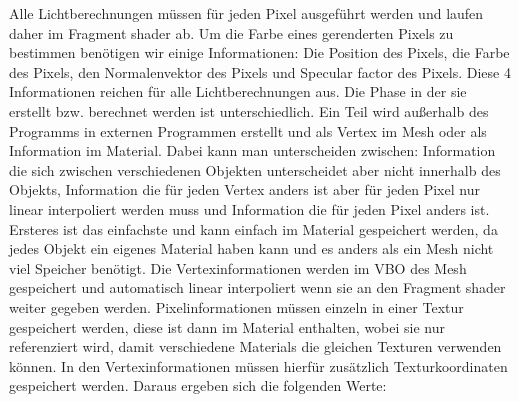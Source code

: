 Alle Lichtberechnungen müssen für jeden Pixel ausgeführt werden und laufen daher im Fragment shader ab.
Um die Farbe eines gerenderten Pixels zu bestimmen benötigen wir einige Informationen: Die Position des Pixels, die Farbe des Pixels, den Normalenvektor des Pixels und Specular factor des Pixels. Diese 4 Informationen reichen für alle Lichtberechnungen aus. Die Phase in der sie erstellt bzw. berechnet werden ist unterschiedlich. Ein Teil wird außerhalb des Programms in externen Programmen erstellt und als Vertex im Mesh oder als Information im Material. Dabei kann man unterscheiden zwischen: Information die sich zwischen verschiedenen Objekten unterscheidet aber nicht innerhalb des Objekts, Information die für jeden Vertex anders ist aber für jeden Pixel nur linear interpoliert werden muss und Information die für jeden Pixel anders ist. Ersteres ist das einfachste und kann einfach im Material gespeichert werden, da jedes Objekt ein eigenes Material haben kann und es anders als ein Mesh nicht viel Speicher benötigt. Die Vertexinformationen werden im \ac{VBO} des Mesh gespeichert und automatisch linear interpoliert wenn sie an den Fragment shader weiter gegeben werden. Pixelinformationen müssen einzeln in einer Textur gespeichert werden, diese ist dann im Material enthalten, wobei sie nur referenziert wird, damit verschiedene Materials die gleichen Texturen verwenden können. In den Vertexinformationen müssen hierfür zusätzlich Texturkoordinaten gespeichert werden. Daraus ergeben sich die folgenden Werte:

